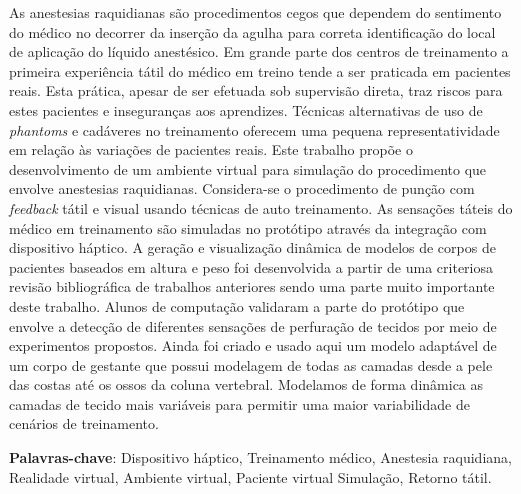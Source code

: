 \begin{resumo}


As anestesias raquidianas são procedimentos cegos que dependem do sentimento do médico no decorrer da inserção da agulha para correta identificação do local de aplicação do líquido anestésico. Em grande parte dos centros de treinamento a primeira experiência tátil do médico em treino tende a ser praticada em pacientes reais. Esta prática, apesar de ser efetuada sob supervisão direta, traz riscos para estes pacientes e inseguranças aos aprendizes. Técnicas alternativas de uso de \textit{phantoms} e cadáveres no treinamento oferecem uma pequena representatividade em relação às variações de pacientes reais. 
Este trabalho propõe o desenvolvimento de um ambiente virtual para simulação do procedimento que envolve anestesias raquidianas. Considera-se o procedimento de punção com \textit{feedback} tátil e visual usando técnicas de auto treinamento. As sensações táteis do médico em treinamento são simuladas no protótipo através da integração com dispositivo háptico. A geração e visualização dinâmica de modelos de corpos de pacientes baseados em altura e peso foi desenvolvida a partir de uma criteriosa revisão bibliográfica de trabalhos anteriores sendo uma parte muito importante deste trabalho. Alunos de computação validaram a parte do protótipo que envolve a detecção de diferentes sensações de perfuração de tecidos por meio de experimentos propostos. Ainda foi criado e usado aqui um modelo adaptável de um corpo de gestante que possui modelagem de todas as camadas desde a pele das costas até os ossos da coluna vertebral. Modelamos de forma dinâmica as camadas de tecido mais variáveis para permitir uma maior variabilidade de cenários de treinamento. 

{\hspace{-8mm} \bf{Palavras-chave}}: Dispositivo háptico, Treinamento médico, Anestesia raquidiana, Realidade virtual, Ambiente virtual, Paciente virtual Simulação, Retorno tátil.

\end{resumo}

